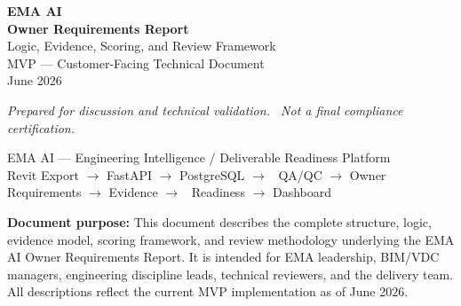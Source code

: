 \documentclass[10pt,letterpaper]{article}
\begin{document}
\color{emaText}

\thispagestyle{empty}
\begin{tcolorbox}[colback=white,colframe=emaNavy,boxrule=1.5pt,arc=5mm,
    left=20pt,right=20pt,top=28pt,bottom=28pt]
\begin{center}
  \vspace{6pt}
  {\Huge\bfseries\textcolor{emaNavy}{EMA AI}}\\[2pt]
  {\Huge\bfseries\textcolor{emaNavy}{Owner Requirements Report}}\\[10pt]
  {\Large\textcolor{emaMuted}{Logic, Evidence, Scoring, and Review Framework}}\\[20pt]
  {\normalsize\textcolor{emaSlate}{MVP --- Customer-Facing Technical Document}}\\[4pt]
  {\normalsize\textcolor{emaSlate}{June 2026}}\\[20pt]
  \begin{tcolorbox}[colback=emaSoft,colframe=emaLine,boxrule=0.5pt,arc=2mm,
      left=14pt,right=14pt,top=8pt,bottom=8pt]
    {\small\itshape\textcolor{emaMuted}{Prepared for discussion and technical validation.%
        \ Not a final compliance certification.}}
  \end{tcolorbox}
  \vspace{10pt}
  {\footnotesize\textcolor{emaMuted}{EMA AI --- Engineering Intelligence / Deliverable Readiness Platform}}\\[2pt]
  {\footnotesize\textcolor{emaMuted}{Revit Export $\rightarrow$ FastAPI $\rightarrow$ PostgreSQL $\rightarrow$%
      \ QA/QC $\rightarrow$ Owner Requirements $\rightarrow$ Evidence $\rightarrow$%
      \ Readiness $\rightarrow$ Dashboard}}
  \vspace{6pt}
\end{center}
\end{tcolorbox}

\vfill
\begin{tcolorbox}[colback=emaSoft2,colframe=emaLine,arc=2mm]
\small\textcolor{emaSlate}{\textbf{Document purpose:} This document describes the complete structure,
  logic, evidence model, scoring framework, and review methodology underlying the EMA AI Owner
  Requirements Report. It is intended for EMA leadership, BIM/VDC managers, engineering discipline
  leads, technical reviewers, and the delivery team. All descriptions reflect the current MVP
  implementation as of June 2026.}
\end{tcolorbox}
\newpage
\end{document}
